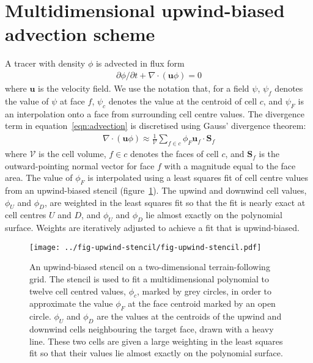 \documentclass{article}
\begin{document}
\section{Multidimensional upwind-biased advection scheme}
A tracer with density $\phi$ is advected in flux form
\begin{align}
	\partial \phi / \partial t + \nabla \cdot \left( \mathbf{u} \phi \right) = 0 \label{eqn:advection}
\end{align}
where $\mathbf{u}$ is the velocity field.  We use the notation that, for a field $\psi$, $\psi_f$ denotes the value of $\psi$ at face $f$, $\psi_c$ denotes the value at the centroid of cell $c$, and $\psi_F$ is an interpolation onto a face from surrounding cell centre values.  The divergence term in equation~\ref{eqn:advection} is discretised using Gauss' divergence theorem:
\begin{align}
	\nabla \cdot \left( \mathbf{u} \phi \right) \approx \frac{1}{\mathcal{V}} \sum_{f \in c} \phi_F \mathbf{u}_f \cdot \mathbf{S}_f
\end{align}
where $\mathcal{V}$ is the cell volume, $f \in c$ denotes the faces of cell $c$, and $\mathbf{S}_f$ is the outward-pointing normal vector for face $f$ with a magnitude equal to the face area.
The value of $\phi_F$ is interpolated using a least squares fit of cell centre values from an upwind-biased stencil (figure~\ref{fig:upwind-stencil}).  The upwind and downwind cell values, $\phi_U$ and $\phi_D$, are weighted in the least squares fit so that the fit is nearly exact at cell centres $U$ and $D$, and $\phi_U$ and $\phi_D$ lie almost exactly on the polynomial surface.  Weights are iteratively adjusted to achieve a fit that is upwind-biased.

\begin{figure}
	\centering
	\texttt{[image: ../fig-upwind-stencil/fig-upwind-stencil.pdf]}
	\caption{An upwind-biased stencil on a two-dimensional terrain-following grid.  The stencil is used to fit a multidimensional polynomial to twelve cell centred values, $\phi_c$, marked by grey circles, in order to approximate the value $\phi_F$ at the face centroid marked by an open circle.  $\phi_U$ and $\phi_D$ are the values at the centroids of the upwind and downwind cells neighbouring the target face, drawn with a heavy line.  These two cells are given a large weighting in the least squares fit so that their values lie almost exactly on the polynomial surface.}
	\label{fig:upwind-stencil}
\end{figure}
\end{document}
